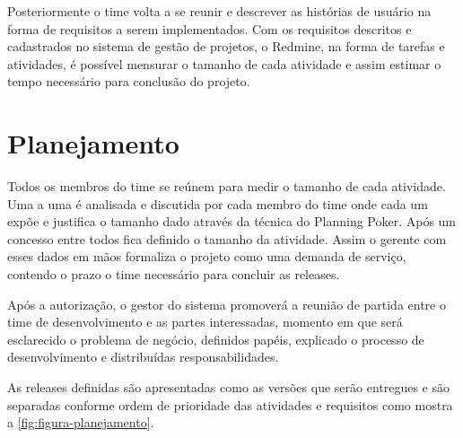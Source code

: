 Posteriormente o time volta a se reunir e descrever as histórias de usuário na forma de requisitos a serem implementados. Com os requisitos descritos e cadastrados no sistema de gestão de projetos, o Redmine, na forma de tarefas e atividades, é possível mensurar o tamanho de cada atividade e assim estimar o tempo necessário para conclusão do projeto.  

\section{Planejamento}
\label{sec:atividadesRealizadasPlanejamento}

Todos os membros do time se reúnem para medir o tamanho de cada atividade. Uma a uma é analisada e discutida por cada membro do time onde cada um expõe e justifica o tamanho dado através da técnica do Planning Poker. Após um concesso entre todos fica definido o tamanho da atividade. Assim o gerente com esses dados em mãos formaliza o projeto como uma demanda de serviço, contendo o prazo o time necessário para concluir as releases.

\begin{citacao}
Após a autorização, o gestor do sistema promoverá a reunião de
partida entre o time de desenvolvimento e as partes interessadas, momento em que será
esclarecido o problema de negócio, definidos papéis, explicado o processo de
desenvolvimento e distribuídas responsabilidades.\cite[p.~2]{Portaria37:2017}
\end{citacao}

As releases definidas são apresentadas como as versões que serão entregues e são separadas conforme ordem de prioridade das atividades e requisitos como mostra a \autoref{fig:figura-planejamento}.


